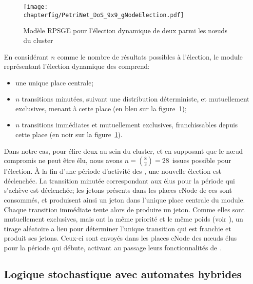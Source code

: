 \begin{figure}[ht]
    \centering
    \texttt{[image: \\chapterfig/PetriNet\_DoS\_9x9\_gNodeElection.pdf]}
    \caption{Modèle RPSGE pour l'élection dynamique de deux \cns parmi les nœuds du cluster}\label{sa:fig:petrielec}
\end{figure}
En considérant $n$ comme le nombre de résultats possibles à l'élection, le module représentant l'élection dynamique des \cns comprend:
\begin{itemize}
    \item une unique place centrale;
    \item $n$ transitions minutées, suivant une distribution déterministe, et mutuellement exclusives, menant à cette place (en bleu sur la figure~\ref{sa:fig:petrielec});
    \item $n$ transitions immédiates et mutuellement exclusives, franchissables depuis cette place (en noir sur la figure~\ref{sa:fig:petrielec}).
\end{itemize}
Dans notre cas, pour élire deux \cns au sein du cluster, et en supposant que le nœud compromis ne peut être élu, nous avons $n=\binom{8}{2}=28$~issues possible pour l'élection.
À la fin d'une période d'activité des \cns, une nouvelle élection est déclenchée.
La transition minutée correspondant aux \cns élus pour la période qui s'achève est déclenchée; les jetons présents dans les places \textsf{cNode} de ces \cns sont consommés, et produisent ainsi un jeton dans l'unique place centrale du module.
Chaque transition immédiate tente alors de produire un jeton.
Comme elles sont mutuellement exclusives, mais ont la même priorité et le même poids (voir ), un tirage aléatoire a lieu pour déterminer l'unique transition qui est franchie et produit ses jetons.
Ceux-ci sont envoyés dans les places \textsf{cNode} des nœuds élus pour la période qui débute, activant au passage leurs fonctionnalités de \cns.
    \subsection{Logique stochastique avec automates hybrides}

